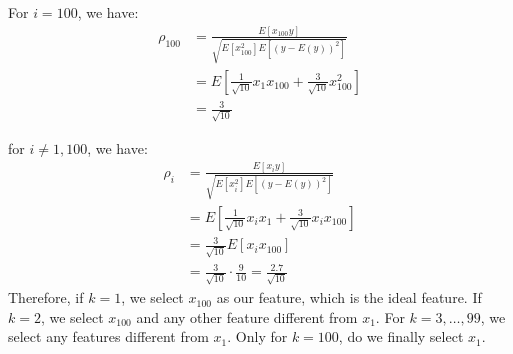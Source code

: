 \documentclass{amsart}
\theoremstyle{definition}
\begin{document}
\begin{enumerate}[(a)]
\begin{enumerate}[i.]
        For $i = 100$, we have:
        \begin{align*}
          \rho_{100} &= \frac{E[x_{100} y]}{\sqrt{E[x_{100}^2] E[(y - E(y))^2]}}\\
          &= E\left[\frac{1}{\sqrt{10}} x_1 x_{100} + \frac{3}{\sqrt{10}} x_{100}^2\right]\\
          &= \frac{3}{\sqrt{10}}
        \end{align*}

        for $i \neq 1, 100$, we have:
        \begin{align*}
          \rho_i &= \frac{E[x_i y]}{\sqrt{E[x_i^2] E[(y - E(y))^2]}}\\
          &= E\left[\frac{1}{\sqrt{10}} x_i x_1 + \frac{3}{\sqrt{10}} x_i x_{100}\right]\\
          &= \frac{3}{\sqrt{10}}E[x_i x_{100}]\\
          &= \frac{3}{\sqrt{10}} \cdot \frac{9}{10} = \frac{2.7}{\sqrt{10}}
        \end{align*}
        Therefore, if $k=1$, we select $x_{100}$ as our feature, which is the ideal feature. 
        If $k=2$, we select $x_{100}$ and any other feature different from $x_1$. 
        For $k=3, \ldots, 99$, we select any features different from $x_1$. Only for $k = 100$, do we finally select $x_1$. 


\end{enumerate}
\end{enumerate}
\end{document}
